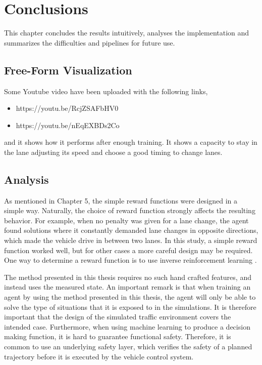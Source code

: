 \chapter{Conclusions}

This chapter concludes the results intuitively, analyses the implementation and summarizes the difficulties and pipelines for future use.

\section{Free-Form Visualization}

Some Youtube video have been uploaded with the following links,

\begin{itemize}
	\item https://youtu.be/RcjZSAFbHV0 
	\item https://youtu.be/nEqEXBDs2Co 
\end{itemize}

and it shows how it performs after enough training. It shows a capacity to stay in the lane adjusting its speed and choose a good timing to change lanes.

\section{Analysis}

As mentioned in Chapter 5, the simple reward functions were designed in a simple way. Naturally, the choice of reward function strongly affects the resulting behavior. For example, when no penalty was given for a lane change, the agent found solutions where it constantly demanded lane changes in opposite directions, which made the vehicle drive in between two lanes. In this study, a simple reward function worked well, but for other cases a more careful design may be required. One way to determine a reward function is to use inverse reinforcement learning \cite{IRL}.

The method presented in this thesis requires no such hand crafted features, and instead uses the measured state. An important remark is that when training an agent by using the method presented in this thesis, the agent will only be able to solve the type of situations that it is exposed to in the simulations. It is therefore important that the design of the simulated traffic environment covers the intended case. Furthermore, when using machine learning to produce a decision making function, it is hard to guarantee functional safety. Therefore, it is common to use an underlying safety layer, which verifies the safety of a planned trajectory before it is executed by the vehicle control system.

